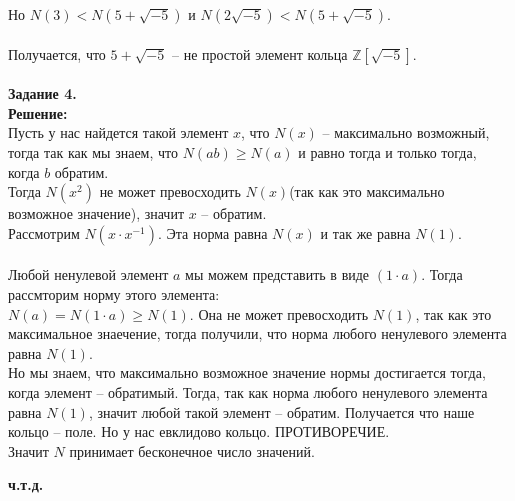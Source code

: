 \documentclass[12pt,a4paper]{scrartcl}
\begin{document}
	Но $N(3) < N(5 + \sqrt{-5})$ и 	$N(2\sqrt{-5}) < N(5 + \sqrt{-5})$.\\
	\\
	Получается, что $5 + \sqrt{-5}$ -- не простой элемент кольца $\mathbb{Z}[\sqrt{-5}]$.\\
	\\
	\textbf{Задание 4.} \\
	\textbf{Решение:} 
	\\
	 Пусть у нас найдется такой элемент $x$, что $N(x)$ -- максимально возможный, тогда так как мы знаем, что $N(ab) \geqslant N(a)$ и равно тогда и только тогда, когда $b$ обратим.\\
	 Тогда $N(x^2)$ не может превосходить $N(x)$(так как это максимально возможное значение), значит $x$ -- обратим.\\
	 Рассмотрим $N(x\cdot x^{-1})$. Эта норма равна $N(x)$ и так же равна $N(1)$.\\
	 \\
	 Любой ненулевой элемент $a$ мы можем представить в виде $(1\cdot a)$. Тогда рассмторим норму этого элемента:\\
	 $N(a) = N(1\cdot a) \geqslant N(1)$. Она не может превосходить $N(1)$, так как это максимальное знаечение, тогда получили, что норма любого ненулевого элемента равна $N(1)$.\\
	 Но мы знаем, что максимально возможное значение нормы достигается тогда, когда элемент -- обратимый. Тогда, так как норма любого ненулевого элемента равна $N(1)$, значит любой такой элемент -- обратим. Получается что наше кольцо -- поле. Но у нас евклидово кольцо. ПРОТИВОРЕЧИЕ.\\
	 Значит $N$ принимает бесконечное число значений.
	 \begin{flushright}
	 	\textbf{ч.т.д.}
	 \end{flushright}
	 
		
\end{document}
